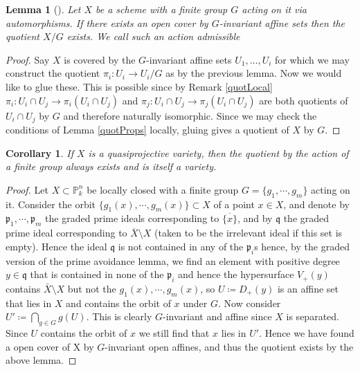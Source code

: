 \documentclass[11pt, a4paper, german, twoside]{article}
\theoremstyle{plain}
\newtheorem{corollary}[theorem]{Corollary}
\newtheorem{lemma}[theorem]{Lemma}
\theoremstyle{definition}
\begin{document}
\begin{lemma}[{\cite[Prop. 1.8]{SGA1}}]    
    Let $X$ be a scheme with a finite group $G$ acting on it via automorphisms. If there exists an open cover by $G$-invariant affine sets
    then the quotient $X/G$ exists.
    We call such an action \emph{admissible}
\end{lemma}
\begin{proof}
    Say $X$ is covered by the $G$-invariant affine sets $U_1,\dots,U_i$ for which we may construct the quotient $\pi_i \colon U_i \to U_i/G$ 
    as by the previous lemma. Now we would like to glue these. This is possible since by Remark \ref{quotLocal} 
$\pi_i \colon U_i \cap U_j \to \pi_i(U_i \cap U_j)$ and $\pi_j \colon U_i \cap U_j \to \pi_j(U_i \cap U_j)$ are both quotients of $U_i \cap U_j$
    by $G$ and therefore naturally isomorphic. Since we may check the conditions of Lemma \ref{quotProps} locally, gluing gives a quotient of 
    $X$ by $G$.
\end{proof}

\begin{corollary}
    If $X$ is a quasiprojective variety, then the quotient by the action of a finite group always exists and is itself a variety.
\end{corollary}
\begin{proof}
    Let $X \subset \mathbb{P}_k^n$ be locally closed with a finite group $G = \{g_1,\cdots,g_m\}$ acting on it. 
    Consider the orbit $\{g_1(x),\cdots,g_m(x)\} \subset X$ of a point $x \in X$, and denote by $\mathfrak{p}_1,\cdots,\mathfrak{p}_m$ the 
    graded prime ideals corresponding to $\overline{\{x\}}$, and by $\mathfrak{q}$ the graded prime ideal corresponding to
    $\overline{X} \setminus X$ (taken to be the irrelevant ideal if this set is empty). 
    Hence the ideal $\mathfrak{q}$ is not contained in any of the $\mathfrak{p}_i$s hence, by the graded version of the prime
    avoidance lemma, we find an element with positive degree $y \in \mathfrak{q}$ that is contained in none of the $\mathfrak{p}_i$ and hence
    the hypersurface $V_+(y)$ contains $\bar{X} \setminus X$ but not the $g_1(x),\cdots,g_m(x)$, so $U \coloneqq D_+(y)$ 
    is an affine set that lies in $X$ and contains the orbit of $x$ under $G$. Now consider $U' \coloneqq \bigcap_{g \in G} g(U)$. 
    This is clearly $G$-invariant and affine since $X$ is separated. 
    Since $U$ contains the orbit of $x$ we still find that $x$ lies in $U'$. Hence we have found a open cover of X by
    $G$-invariant open affines, and thus the quotient exists by the above lemma.
\end{proof}
\end{document}

